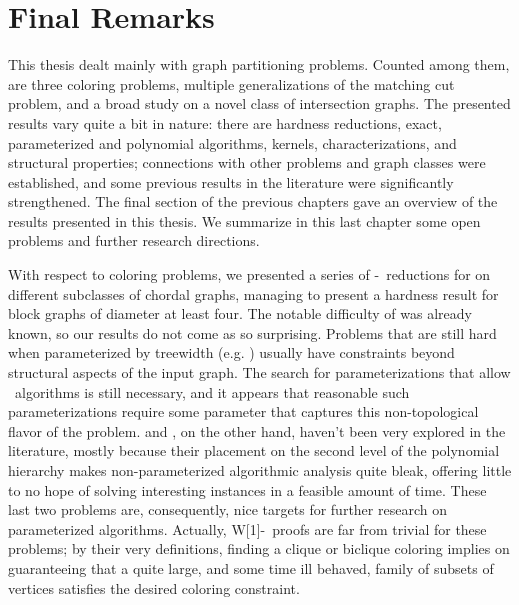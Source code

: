 \chapter{Final Remarks}
\label{ch:conclusion}

This thesis dealt mainly with graph partitioning problems.
Counted among them, are three coloring problems, multiple generalizations of the matching cut problem, and a broad study on a novel class of intersection graphs.
The presented results vary quite a bit in nature: there are hardness reductions, exact, parameterized and polynomial algorithms, kernels,  characterizations, and structural properties; connections with other problems and graph classes were established, and some previous results in the literature were significantly strengthened.
The final section of the previous chapters gave an overview of the results presented in this thesis.
We summarize in this last chapter some open problems and further research directions.

With respect to coloring problems, we presented a series of \W[1]-\Hness\ reductions for  on different subclasses of chordal graphs, managing to present a hardness result for block graphs of diameter at least four.
The notable difficulty of  was already known, so our results do not come as so surprising.
Problems that are still hard when parameterized by treewidth (e.g. ) usually have constraints beyond structural aspects of the input graph.
The search for parameterizations that allow \FPT\ algorithms is still necessary, and it appears that reasonable such parameterizations require some parameter that captures this non-topological flavor of the problem.
 and , on the other hand, haven't been very explored in the literature, mostly because their placement on the second level of the polynomial hierarchy makes non-parameterized algorithmic analysis quite bleak, offering little to no hope of solving interesting instances in a feasible amount of time.
These last two problems are, consequently, nice targets for further research on parameterized algorithms.
Actually, W[1]-\Hness\ proofs are far from trivial for these problems; by their very definitions, finding a clique or biclique coloring implies on guaranteeing that a quite large, and some time ill behaved, family of subsets of vertices satisfies the desired coloring constraint.

